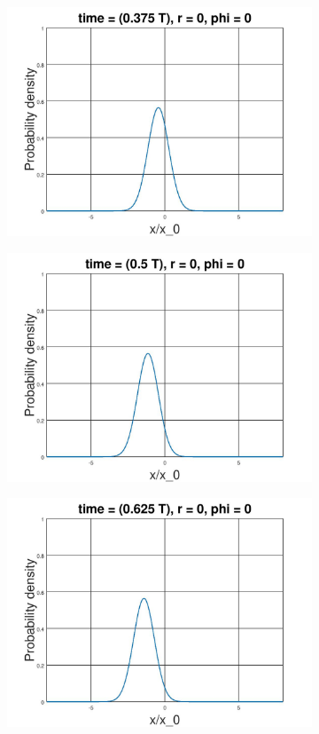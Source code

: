 \documentclass[12pt, twoside]{article}
\begin{document}
\begin{figure}[h!]
\begin{subfigure}[h!]{0.3\linewidth}
		\includegraphics[width=\linewidth]{graphs/coherent/3.jpg}
	\end{subfigure}
\begin{subfigure}[h!]{0.3\linewidth}
	\includegraphics[width=\linewidth]{graphs/coherent/4.jpg}
\end{subfigure}
\begin{subfigure}[h!]{0.3\linewidth}
	\includegraphics[width=\linewidth]{graphs/coherent/5.jpg}

\end{subfigure}
\end{figure}
\end{document}
